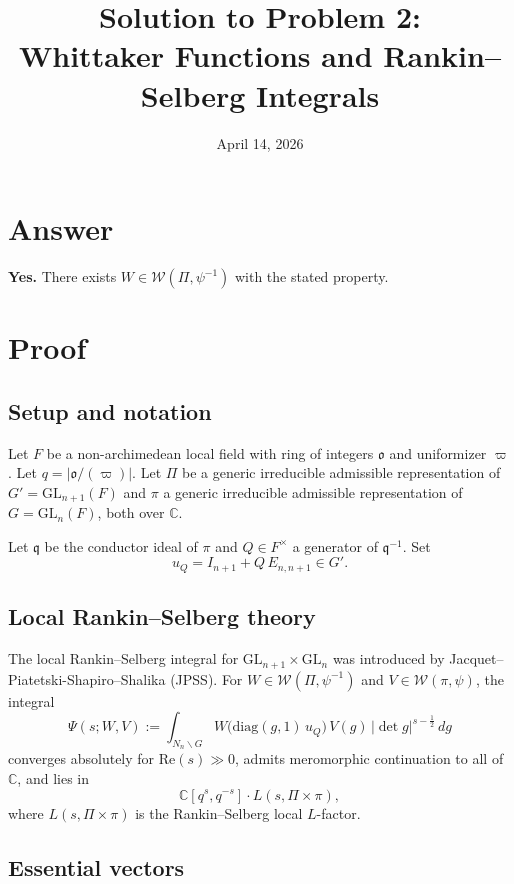 \documentclass[12pt]{article}
\title{Solution to Problem 2:\\Whittaker Functions and Rankin--Selberg Integrals}
\author{}
\date{April 14, 2026}
\begin{document}
\maketitle

\section*{Answer}

\textbf{Yes.} There exists $W \in \mathcal{W}(\Pi, \psi^{-1})$ with the stated property.

\section*{Proof}

\subsection*{Setup and notation}

Let $F$ be a non-archimedean local field with ring of integers $\mathfrak{o}$ and uniformizer $\varpi$.  Let $q = |\mathfrak{o}/(\varpi)|$.  Let $\Pi$ be a generic irreducible admissible representation of $G' = \mathrm{GL}_{n+1}(F)$ and $\pi$ a generic irreducible admissible representation of $G = \mathrm{GL}_n(F)$, both over $\mathbb{C}$.

Let $\mathfrak{q}$ be the conductor ideal of $\pi$ and $Q \in F^\times$ a generator of $\mathfrak{q}^{-1}$.  Set
\[
  u_Q = I_{n+1} + Q\,E_{n,n+1} \in G'.
\]

\subsection*{Local Rankin--Selberg theory}

The local Rankin--Selberg integral for $\mathrm{GL}_{n+1} \times \mathrm{GL}_n$ was introduced by Jacquet--Piatetski-Shapiro--Shalika (JPSS).  For $W \in \mathcal{W}(\Pi,\psi^{-1})$ and $V \in \mathcal{W}(\pi,\psi)$, the integral
\[
  \Psi(s;W,V) := \int_{N_n\backslash G}
    W\!\bigl(\mathrm{diag}(g,1)\,u_Q\bigr)\,V(g)\,|\det g|^{s-\frac12}\,dg
\]
converges absolutely for $\mathrm{Re}(s) \gg 0$, admits meromorphic continuation to all of $\mathbb{C}$, and lies in
\[
  \mathbb{C}[q^s, q^{-s}]\cdot L(s,\Pi\times\pi),
\]
where $L(s,\Pi\times\pi)$ is the Rankin--Selberg local $L$-factor.

\subsection*{Essential vectors}
\end{document}

